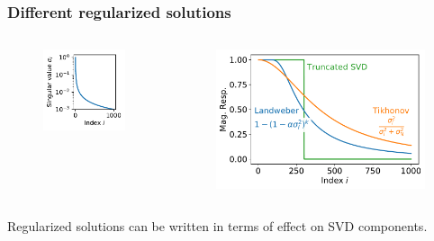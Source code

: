 \documentclass[xcolor={dvipsnames}]{beamer}
\begin{document}
\begin{frame}
\frametitle{Different regularized solutions}
\begin{columns}
\begin{figure}
\includegraphics[width=\textwidth]{figs/sv-spectrum.pdf}
\end{figure}
\begin{figure}
\includegraphics[width=\textwidth]{figs/regularization.pdf}
\end{figure}
\end{columns}
\begin{exampleblock}{}
Regularized solutions can be written in terms of effect on SVD components.
\end{exampleblock}
\end{frame}
\end{document}
